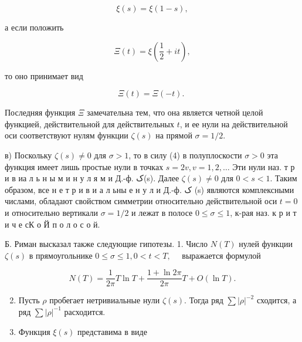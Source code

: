 \documentclass[10pt]{article}
\begin{document}
\[

\xi(s)=\xi(1-s),

\]



а если положить



\[

\Xi(t)=\xi\left(\frac{1}{2}+i t\right),

\]



то оно принимает вид



\[

\Xi(t)=\Xi(-t) \text {. }

\]



Последняя функция $\Xi$ замечательна тем, что она является четной целой функцией, действительной для действительных $t$, и ее нули на действительной оси соответствуют нулям функции $\zeta(s)$ на прямой $\sigma=1 / 2$.



в) Поскольку $\zeta(s) \neq 0$ для $\sigma>1$, то в силу (4) в полуплоскости $\sigma>0$ эта функция имеет лишь простые нули в точках $s=2 v, v=1,2, \ldots$ Эти нули наз. т р и в иа л ь н ы м и н у л я м и Д.-ф. ک(s). Далее $\zeta(s) \neq 0$ для $0<s<1$. Таким образом, все н е т р и в и а л ьны е н у л и Д.-ф. ک (s) являются комплексными числами, обладают свойством симметрии относительно действительной оси $t=0$ и относительно вертикали $\sigma=1 / 2$ и лежат в полосе $0 \leqslant \sigma \leqslant 1$, к-рая наз. к р и т и ч е сК о Й п о л о с о й.



Б. Риман высказал также следующие гипотезы. 1. Число $N(T)$ нулей функции $\zeta(s)$ в прямоугольнике $0 \leqslant \sigma \leqslant 1,0<t<T, \quad$ выражается формулой



\[

N(T)=\frac{1}{2 \pi} T \ln T+\frac{1+\ln 2 \pi}{2 \pi} T+O(\ln T) .

\]



\begin{enumerate}

  \setcounter{enumi}{1}

  \item Пусть $\rho$ пробегает нетривиальные нули $\zeta(s)$. Тогда ряд $\sum|\rho|^{-2}$ сходится, а ряд $\sum|\rho|^{-1}$ расходится.



  \item Функция $\xi(s)$ представима в виде



\end{enumerate}
\end{document}
